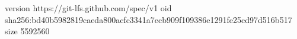 version https://git-lfs.github.com/spec/v1
oid sha256:bd40b5982819caeda800acfc3341a7ecb909f109386e1291fe25cd97d516b517
size 5592560
